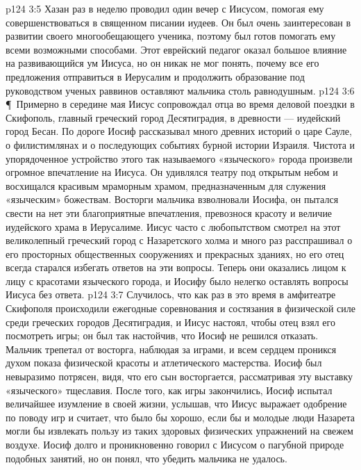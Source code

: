 \vs p124 3:5 Хазан раз в неделю проводил один вечер с Иисусом, помогая ему совершенствоваться в священном писании иудеев. Он был очень заинтересован в развитии своего многообещающего ученика, поэтому был готов помогать ему всеми возможными способами. Этот еврейский педагог оказал большое влияние на развивающийся ум Иисуса, но он никак не мог понять, почему все его предложения отправиться в Иерусалим и продолжить образование под руководством ученых раввинов оставляют мальчика столь равнодушным.
\vs p124 3:6 \P\ Примерно в середине мая Иисус сопровождал отца во время деловой поездки в Скифополь, главный греческий город Десятиградия, в древности --- иудейский город Бесан. По дороге Иосиф рассказывал много древних историй о царе Сауле, о филистимлянах и о последующих событиях бурной истории Израиля. Чистота и упорядоченное устройство этого так называемого «языческого» города произвели огромное впечатление на Иисуса. Он удивлялся театру под открытым небом и восхищался красивым мраморным храмом, предназначенным для служения «языческим» божествам. Восторги мальчика взволновали Иосифа, он пытался свести на нет эти благоприятные впечатления, превознося красоту и величие иудейского храма в Иерусалиме. Иисус часто с любопытством смотрел на этот великолепный греческий город с Назаретского холма и много раз расспрашивал о его просторных общественных сооружениях и прекрасных зданиях, но его отец всегда старался избегать ответов на эти вопросы. Теперь они оказались лицом к лицу с красотами языческого города, и Иосифу было нелегко оставлять вопросы Иисуса без ответа.
\vs p124 3:7 Случилось, что как раз в это время в амфитеатре Скифополя происходили ежегодные соревнования и состязания в физической силе среди греческих городов Десятиградия, и Иисус настоял, чтобы отец взял его посмотреть игры; он был так настойчив, что Иосиф не решился отказать. Мальчик трепетал от восторга, наблюдая за играми, и всем сердцем проникся духом показа физической красоты и атлетического мастерства. Иосиф был невыразимо потрясен, видя, что его сын восторгается, рассматривая эту выставку «языческого» тщеславия. После того, как игры закончились, Иосиф испытал величайшее изумление в своей жизни, услышав, что Иисус выражает одобрение по поводу игр и считает, что было бы хорошо, если бы и молодые люди Назарета могли бы извлекать пользу из таких здоровых физических упражнений на свежем воздухе. Иосиф долго и проникновенно говорил с Иисусом о пагубной природе подобных занятий, но он понял, что убедить мальчика не удалось.
